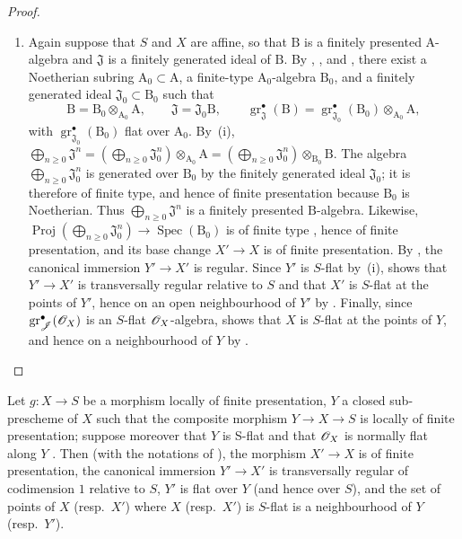 \begin{proof}
\begin{enumerate}[label=(\roman*)]
  \item Again suppose that $S$ and $X$ are affine, so that $\mathrm{B}$ is a finitely presented $\mathrm{A}$-algebra and $\mathfrak{J}$ is a finitely generated ideal of $\mathrm{B}$. By , , and , there exist a Noetherian subring $\mathrm{A}_0\subset\mathrm{A}$, a finite-type $\mathrm{A}_0$-algebra $\mathrm{B}_0$, and a finitely generated ideal $\mathfrak{J}_0\subset\mathrm{B}_0$ such that
\[
  \mathrm{B}=\mathrm{B}_0\otimes_{\mathrm{A}_0}\mathrm{A},\qquad
  \mathfrak{J}=\mathfrak{J}_0\mathrm{B},\qquad
  \operatorname{gr}_{\mathfrak J}^\bullet(\mathrm{B})=\operatorname{gr}_{\mathfrak{J}_0}^\bullet(\mathrm{B}_0)\otimes_{\mathrm{A}_0}\mathrm{A},
\]
with $\operatorname{gr}_{\mathfrak{J}_0}^\bullet(\mathrm{B}_0)$ flat over $\mathrm{A}_0$. By~(i), $\bigoplus_{n\geq0}\mathfrak{J}^n=\left(\bigoplus_{n\geq0}\mathfrak{J}_0^n\right)\otimes_{\mathrm{A}_0}\mathrm{A}=\left(\bigoplus_{n\geq0}\mathfrak{J}_0^n\right)\otimes_{\mathrm{B}_0}\mathrm{B}$.
The algebra $\bigoplus_{n\geq0}\mathfrak{J}_0^n$ is generated over $\mathrm{B}_0$ by the finitely generated ideal $\mathfrak{J}_0$; it is therefore of finite type, and hence of finite presentation because $\mathrm{B}_0$ is Noetherian. Thus $\bigoplus_{n\geq0}\mathfrak{J}^n$ is a finitely presented $\mathrm{B}$-algebra. Likewise, $\operatorname{Proj}(\bigoplus_{n\geq0}\mathfrak{J}_0^n)\to\operatorname{Spec}(\mathrm{B}_0)$ is of finite type , hence of finite presentation, and its base change $X'\to X$ is of finite presentation.
By , the canonical immersion $Y'\to X'$ is regular. Since $Y'$ is $S$-flat by~(i),  shows that $Y'\to X'$ is transversally regular relative to $S$ and that $X'$ is $S$-flat at the points of $Y'$, hence on an open neighbourhood of $Y'$ by . Finally, since $\operatorname{gr}_{\mathscr{J}}^\bullet(\mathscr{O}_X)$ is an $S$-flat $\mathscr{O}_X$-algebra,  shows that $X$ is $S$-flat at the points of $Y$, and hence on a neighbourhood of $Y$ by .
\end{enumerate}
\end{proof}

\begin{corollary}[19.4.7]
\label{IV.19.4.7}
Let $g:X\to S$ be a morphism locally of finite presentation, $Y$ a closed sub-prescheme of $X$ such that the composite morphism $Y\to X\to S$ is locally of finite presentation; suppose moreover that $Y$ is S-flat and that $\mathscr{O}_X$ is normally flat along $Y$ .
Then \textup{(with the notations of )}, the morphism $X'\to X$ is of finite presentation, the canonical immersion $Y'\to X'$ is transversally regular of codimension $1$ relative to $S$, $Y'$ is flat over $Y$ (and hence over $S$), and the set of points of $X$ \textup{(resp.\ $X'$)} where $X$ \textup{(resp.\ $X'$)} is $S$-flat is a neighbourhood of $Y$ \textup{(resp.\ $Y'$)}.
\end{corollary}

